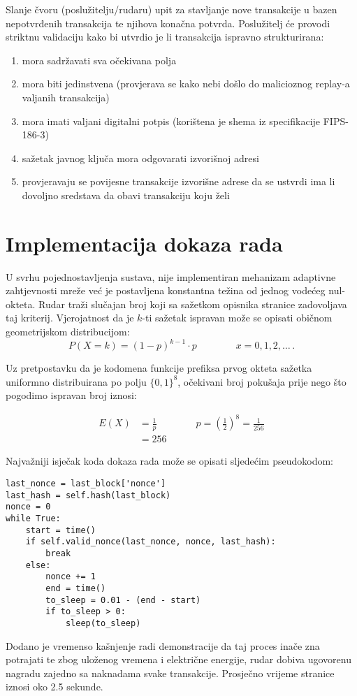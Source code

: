 \documentclass[utf8, zavrsni]{fer}
\begin{document}
Slanje čvoru (poslužitelju/rudaru) upit za stavljanje nove transakcije u bazen nepotvrđenih transakcija te njihova konačna potvrda. Poslužitelj će provodi striktnu validaciju kako bi utvrdio je li transakcija ispravno strukturirana:

\begin{enumerate}
	\item mora sadržavati sva očekivana polja
	\item mora biti jedinstvena (provjerava se kako nebi došlo do malicioznog replay-a valjanih transakcija)
	\item mora imati valjani digitalni potpis (korištena je shema iz specifikacije FIPS-186-3)
	\item sažetak javnog ključa mora odgovarati izvorišnoj adresi
	\item provjeravaju se povijesne transakcije izvorišne adrese da se ustvrdi ima li dovoljno sredstava da obavi transakciju koju želi
\end{enumerate}

\section{Implementacija dokaza rada}
U svrhu pojednostavljenja sustava, nije implementiran mehanizam adaptivne zahtjevnosti mreže već je postavljena konstantna težina od jednog vodećeg nul-okteta. Rudar traži slučajan broj koji sa sažetkom opisnika stranice zadovoljava taj kriterij. Vjerojatnost da je $k$-ti sažetak ispravan može se opisati običnom geometrijskom distribucijom:
$$
P(X=k) = (1 - p) ^ {k-1} \cdot p \qquad \qquad x=0,1,2,\ldots \, .
$$

Uz pretpostavku da je kodomena funkcije prefiksa prvog okteta sažetka uniformno distribuirana po polju $\{0,1\} ^{8}$, očekivani broj pokušaja prije nego što pogodimo ispravan broj iznosi:

\begin{equation} \label{eq1}
\begin{split}
E(X) &= \frac{1}{p} \qquad \qquad p = (\frac{1}{2}) ^ {8} = \frac{1}{256} \\
     &= 256
\end{split}
\end{equation}

Najvažniji isječak koda dokaza rada može se opisati sljedećim pseudokodom:

\begin{verbatim}
last_nonce = last_block['nonce']
last_hash = self.hash(last_block)
nonce = 0
while True:
	start = time()
	if self.valid_nonce(last_nonce, nonce, last_hash):
		break
	else:
		nonce += 1
		end = time()
		to_sleep = 0.01 - (end - start)
		if to_sleep > 0:
		    sleep(to_sleep)

\end{verbatim}
Dodano je vremenso kašnjenje radi demonstracije da taj proces inače zna potrajati te zbog uloženog vremena i električne energije, rudar dobiva ugovorenu nagradu zajedno sa naknadama svake transakcije. Prosječno vrijeme stranice iznosi oko 2.5 sekunde.
\end{document}
